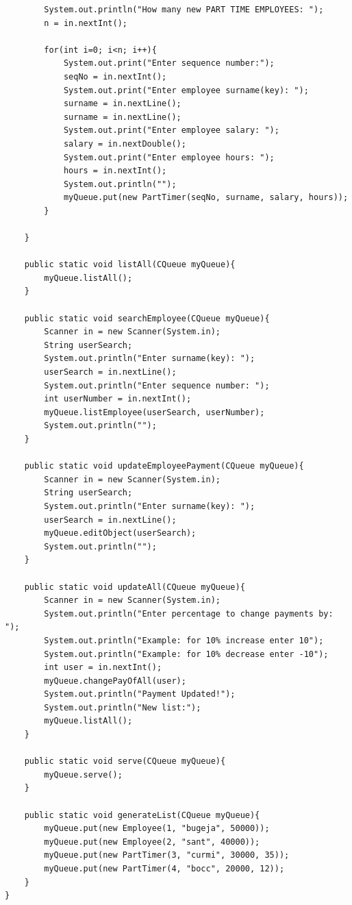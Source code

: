 \documentclass[12pt]{article}
\begin{document}
\begin{lstlisting}
        System.out.println("How many new PART TIME EMPLOYEES: ");
        n = in.nextInt();
        
        for(int i=0; i<n; i++){
            System.out.print("Enter sequence number:");
            seqNo = in.nextInt();
            System.out.print("Enter employee surname(key): ");
            surname = in.nextLine();
            surname = in.nextLine();
            System.out.print("Enter employee salary: ");
            salary = in.nextDouble();
            System.out.print("Enter employee hours: ");
            hours = in.nextInt();
            System.out.println("");
            myQueue.put(new PartTimer(seqNo, surname, salary, hours));
        }     
        
    }

    public static void listAll(CQueue myQueue){       
        myQueue.listAll();
    }

    public static void searchEmployee(CQueue myQueue){    
        Scanner in = new Scanner(System.in);
        String userSearch;           
        System.out.println("Enter surname(key): ");
        userSearch = in.nextLine();
        System.out.println("Enter sequence number: ");
        int userNumber = in.nextInt();
        myQueue.listEmployee(userSearch, userNumber);
        System.out.println("");
    }

    public static void updateEmployeePayment(CQueue myQueue){       
        Scanner in = new Scanner(System.in);
        String userSearch;   
        System.out.println("Enter surname(key): ");
        userSearch = in.nextLine();
        myQueue.editObject(userSearch);
        System.out.println("");
    }

    public static void updateAll(CQueue myQueue){  
        Scanner in = new Scanner(System.in);   
        System.out.println("Enter percentage to change payments by: ");
        System.out.println("Example: for 10% increase enter 10");
        System.out.println("Example: for 10% decrease enter -10");
        int user = in.nextInt();
        myQueue.changePayOfAll(user);
        System.out.println("Payment Updated!");
        System.out.println("New list:");
        myQueue.listAll();
    }

    public static void serve(CQueue myQueue){
        myQueue.serve();
    }

    public static void generateList(CQueue myQueue){
        myQueue.put(new Employee(1, "bugeja", 50000));
        myQueue.put(new Employee(2, "sant", 40000));
        myQueue.put(new PartTimer(3, "curmi", 30000, 35));
        myQueue.put(new PartTimer(4, "bocc", 20000, 12));
    }
}

\end{lstlisting}


\end{document}
